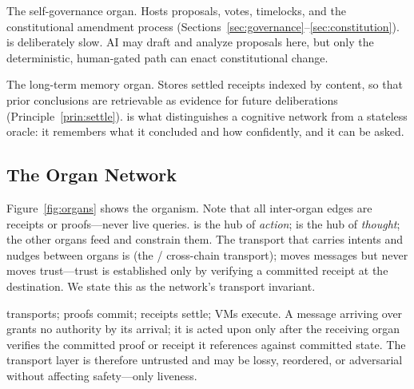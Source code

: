 \begin{description}[style=nextline,leftmargin=0pt]
\item[\GChain{} --- Governance (self-governance).] The self-governance organ. Hosts proposals, votes, timelocks, and the constitutional amendment process (Sections~\ref{sec:governance}--\ref{sec:constitution}). \GChain{} is deliberately slow. AI may draft and analyze proposals here, but only the deterministic, human-gated path can enact constitutional change.

\item[\MChain{} --- Memory.] The long-term memory organ. Stores settled \PoT{} receipts indexed by content, so that prior conclusions are retrievable as evidence for future deliberations (Principle~\ref{prin:settle}). \MChain{} is what distinguishes a cognitive network from a stateless oracle: it remembers what it concluded and how confidently, and it can be asked.
\end{description}

\subsection{The Organ Network}

Figure~\ref{fig:organs} shows the organism. Note that all inter-organ edges are receipts or proofs---never live queries. \CChain{} is the hub of \emph{action}; \AChain{} is the hub of \emph{thought}; the other organs feed and constrain them. The transport that carries intents and nudges between organs is \ZAP{} (the \Zoo{}/\Lux{} cross-chain transport); \ZAP{} moves messages but never moves trust---trust is established only by verifying a committed receipt at the destination. We state this as the network's transport invariant.

\begin{principle}
\label{prin:zap}
\ZAP{} transports; proofs commit; receipts settle; VMs execute. A message arriving over \ZAP{} grants no authority by its arrival; it is acted upon only after the receiving organ verifies the committed proof or receipt it references against committed state. The transport layer is therefore untrusted and may be lossy, reordered, or adversarial without affecting safety---only liveness.
\end{principle}

